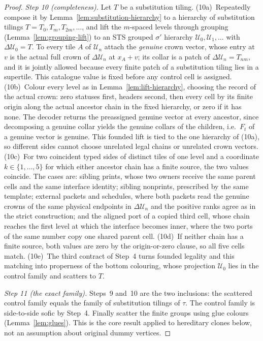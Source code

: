 \begin{proof}
\emph{Step 10 (completeness).}  Let $T$ be a substitution tiling.
(10a)~Repeatedly compose it by Lemma~\ref{lem:substitution-hierarchy} to a
hierarchy of substitution tilings $T=T_0,T_m,T_{2m},\ldots$, and lift the
$m$-spaced levels through grouping (Lemma~\ref{lem:grouping-lift}) to an
STS grouped $\sigma'$ hierarchy $\mathcal U_0,\mathcal U_1,\ldots$ with
$\Delta\mathcal U_0=T$.  To every tile $A$ of $\mathcal U_n$ attach the
\emph{genuine} crown vector, whose entry at $v$ is the actual full crown of
$\Delta\mathcal U_n$ at $x_A+v$; its collar is a patch of
$\Delta\mathcal U_n=T_{nm}$, and it is jointly allowed because every finite
patch of a substitution tiling lies in a supertile.  This catalogue value is
fixed before any control cell is assigned.  (10b)~Colour every level as in
Lemma~\ref{lem:lift-hierarchy}, choosing the record of the actual crown:
zero statuses first, headers second, then every cell by its finite origin
along the actual ancestor chain in the fixed hierarchy, or zero if it has
none.  The decoder returns the preassigned genuine vector at every
ancestor, since decomposing a genuine collar yields the genuine collars of
the children, i.e.\ $F_t$ of a genuine vector is genuine.  This founded
lift is tied to the one hierarchy of (10a), so different sides cannot
choose unrelated legal chains or unrelated crown vectors.  (10c)~For two
coincident typed sides of distinct tiles of one level and a coordinate
$k\in\{1,\ldots,5\}$ for which either ancestor chain has a finite source,
the two values coincide.  The cases are: sibling prints, whose two owners
receive the same parent cells and the same interface identity; sibling
nonprints, prescribed by the same template; external packets and schedules,
where both packets read the genuine crowns of the same physical endpoints
in $\Delta\mathcal U_n$ and the positive ranks agree as in the strict
construction; and the aligned port of a copied third cell, whose chain
reaches the first level at which the interface becomes inner, where the
two ports of the same number copy one shared parent cell.  (10d)~If neither
chain has a finite source, both values are zero by the origin-or-zero
clause, so all five cells match.  (10e)~The third contract of Step~4 turns
founded legality and this matching into properness of the bottom
colouring, whose projection $\mathcal U_0$ lies in the control family and
scatters to $T$.

\emph{Step 11 (the exact family).}  Steps~9 and~10 are the two inclusions:
the scattered control family equals the family of substitution tilings of
$\tau$.  The control family is side-to-side sofic by Step~4.  Finally
scatter the finite groups using glue colours (Lemma~\ref{lem:glues}).  This
is the core result applied to hereditary clones below, not an assumption
about original dummy vertices.
\end{proof}

